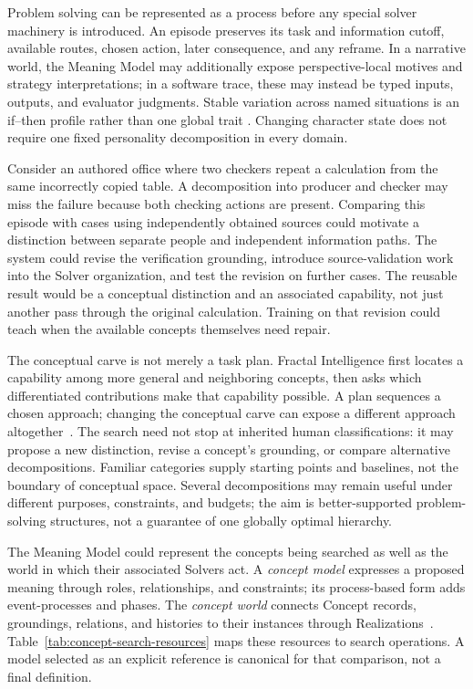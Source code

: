 \documentclass[10pt]{article}
\begin{document}
Problem solving can be represented as a process before any special solver
machinery is introduced. An episode preserves its task and information cutoff,
available routes, chosen action, later consequence, and any reframe. In a
narrative world, the Meaning Model may additionally expose perspective-local motives
and strategy interpretations; in a software trace, these may instead be typed
inputs, outputs, and evaluator judgments. Stable variation across named
situations is an if--then profile rather than one global trait
\cite{shoda1994signatures,mischelShoda1995caps}. Changing character state does
not require one fixed personality decomposition in every domain.

Consider an authored office where two checkers repeat a calculation from the
same incorrectly copied table. A decomposition into producer and checker may
miss the failure because both checking actions are present. Comparing this
episode with cases using independently obtained sources could motivate a
distinction between separate people and independent information paths. The
system could revise the verification grounding, introduce source-validation
work into the Solver organization, and test the revision on further cases.
The reusable result would be a conceptual distinction and an associated
capability, not just another pass through the original calculation. Training
on that revision could teach when the available concepts themselves need repair.

The conceptual carve is not merely a task plan. Fractal Intelligence first
locates a capability among more general and neighboring concepts, then asks
which differentiated contributions make that capability possible. A plan
sequences a chosen approach; changing the conceptual carve can expose a
different approach altogether~\cite{westerbergFractal2026}. The search need not
stop at inherited human classifications: it may propose a new distinction,
revise a concept's grounding, or compare alternative decompositions. Familiar
categories supply starting points and baselines, not the boundary of conceptual
space. Several decompositions may remain useful under different purposes,
constraints, and budgets; the aim is better-supported problem-solving
structures, not a guarantee of one globally optimal hierarchy.

The Meaning Model could represent the concepts being searched as well as the
world in which their associated Solvers act. A \emph{concept model} expresses
a proposed meaning through roles, relationships, and constraints; its
process-based form adds event-processes and phases. The \emph{concept world}
connects Concept records, groundings, relations, and histories to their
instances through Realizations~\cite{westerbergMeaning2026}.
Table~\ref{tab:concept-search-resources} maps these resources to search
operations. A model selected as an explicit reference is canonical for that
comparison, not a final definition.
\end{document}
